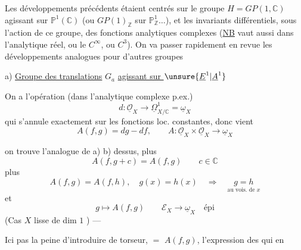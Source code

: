 Les développements précédents étaient centrés
sur le groupe $H=GP(1,\mathbb{C})$ agissant sur $\mathbb{P}^{1}(\mathbb{C})$
(ou $GP(1)_{\mathbb{Z}}$ sur $\mathbb{P}^{1}_{\mathbb{Z}}\ldots$), et les invariants
différentiels, sous l'action de ce groupe, des
fonctions analytiques complexes (\uline{NB} 
vaut aussi dans l'analytique réel, ou le
$C^{\infty}$, ou $C^3$).
On va passer rapidement en revue les développements
analogues pour d'autres groupes

a) \uline{Groupe des translations} $G_a$ \uline{agissant sur $\unsure{\underline{E}^{1}|\underline{A}^{1}}$}

On a l'opération (dans l'analytique complexe
p.ex.)
\[
d:\underline{\mathcal{O}}_X\longrightarrow\underline{\Omega}^{1}_{X/\mathbb{C}}
=\underline{\omega}_X
\]
qui 
s'annule exactement sur les fonctions
loc. constantes, donc vient
\[
A(f,g)=dg-df,\qquad
A:\underline{\mathcal{O}}_X\times\underline{\mathcal{O}}_X
\longrightarrow\underline{\omega}_X
\]

on trouve l'analogue de a) b) dessus,
plus
\[
A(f,g+c)=A(f,g)\qquad c\in\mathbb{C}
\]
plus
\[
A(f,g)=A(f,h),\quad g(x)=h(x)\quad\Longrightarrow\quad
\underset{\text{au vois. de }x}{g=h}
\]
et
\[
g\longmapsto A(f,g)\qquad
\mathcal{E}_X\longrightarrow\underline{\omega}_X\quad\text{épi}
\]
(Cas $X$ lisse de dim $1$ ) ---

Ici pas la peine d'introduire de torseur,
 $=$ $A(f,g)$,  l'expression
des   qui en 

